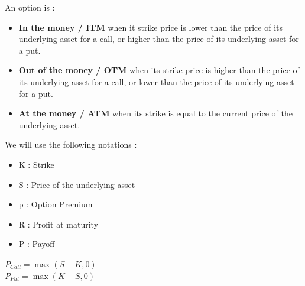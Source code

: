 An option is :
\begin{itemize}
    \item \textbf{In the money / ITM} when it strike price is lower than the price of its underlying asset for a call, or higher than the price of its underlying asset for a put.
    \item \textbf{Out of the money / OTM} when its strike price is higher than the price of its underlying asset for a call, or lower than the price of its underlying asset for a put.
    \item \textbf{At the money / ATM} when its strike is equal to the current price of the underlying asset.
\end{itemize}
We will use the following notations :
\begin{itemize}
    \item K : Strike
    \item S : Price of the underlying asset
    \item p : Option Premium
    \item R : Profit at maturity
    \item P : Payoff
\end{itemize}

\bigskip

\begin{definitionbox}[frametitle = {Payoff Formulas}]
\begin{center}
    $P_{Call} = \max(S-K,0)$ \\
    $P_{Put} = \max(K-S,0)$
\end{center}

\end{definitionbox}

